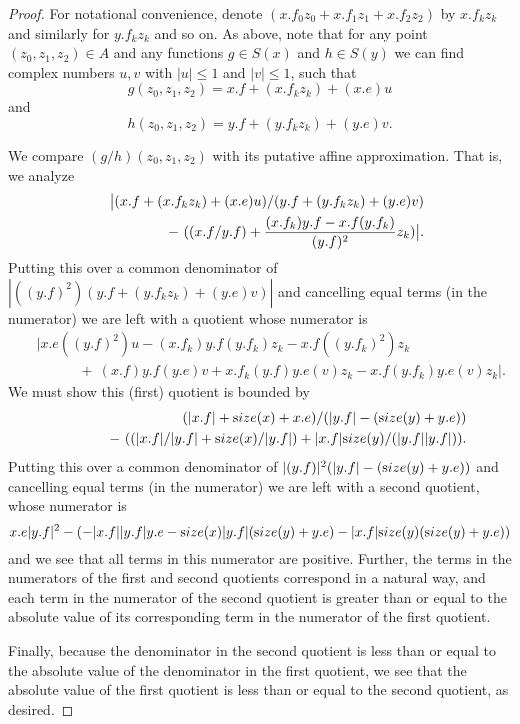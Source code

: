 \begin{proof}{} 
For notational convenience, denote $(x.f_0 z_0 + x.f_1 z_1 + x.f_2 z_2)$ by $x.f_k z_k$ and similarly for $y.f_k z_k$ and so on.
As above, note that for any point $(z_0, z_1, z_2) \in A$ and any functions $g \in S(x)$ and $h \in S(y)$ we can find complex numbers $u, v$ with $|u| \le 1$ and $|v| \le 1$, such that
$$ g(z_0, z_1, z_2) = x.f + (x.f_k z_k) + (x.e) u$$ and 
$$ h(z_0, z_1, z_2) = y.f + (y.f_k z_k) + (y.e) v.$$ 

We compare $(g/h)(z_0, z_1, z_2)$ with its putative affine approximation.  That is, we analyze
\begin{eqnarray*}
&&\big|(x.f + (x.f_k z_k) + (x.e) u)/(y.f + (y.f_k z_k) + (y.e) v)\\
&&\qquad\quad - \
((x.f / y.f) + {(x.f_k) y.f - x.f (y.f_k) \over (y.f)^2} z_k)\big|
          . \end{eqnarray*}
Putting this over a common denominator  of 
$|((y.f)^2)(y.f + (y.f_k z_k) + (y.e) v)|$
and cancelling equal terms (in the numerator) we are left with a quotient whose numerator is 
\begin{eqnarray*} &&
|x.e ((y.f)^2) u - (x.f_k) y.f (y.f_k) z_k - x.f ((y.f_k)^2) z_k\\
&&\qquad\quad  + \
(x.f) y.f (y.e) v + x.f_k (y.f) y.e (v) z_k - x.f (y.f_k) y.e (v) z_k|.              
\end{eqnarray*}
We must show this (first) quotient is bounded by
\begin{eqnarray*}
&&
(|x.f| + {\textrm size}(x) + x.e) /(|y.f| - ({\textrm size}(y) + y.e)) \\
&&\qquad\quad - \
((|x.f|/|y.f| + {\textrm size}(x)/|y.f|) + |x.f| {\textrm size}(y)/(|y.f||y.f|)).        
\end{eqnarray*}
Putting this over a common denominator of 
$|(y.f)|^2 (|y.f| - ({\textrm size}(y) + y.e))$ 
and cancelling equal terms (in the numerator) we are left with a second quotient, whose numerator is 
$$x.e |y.f|^2 - (-|x.f| |y.f| y.e - {\textrm size}(x) |y.f| ({\textrm size}(y) + y.e) -
|x.f| {\textrm size}(y) ({\textrm size}(y) + y.e))$$
and we see that all terms in this numerator are positive.
Further, the terms in the numerators of the first and second quotients correspond in a natural way, and each term in the numerator of the second quotient  is greater than or equal to the absolute value of its corresponding term in the numerator of the first quotient.  

Finally,
 because the denominator in the second quotient is less than or equal to the absolute value of the denominator in the first quotient, we
see that the absolute value of the first quotient is less than or equal to the second quotient, as desired. \end{proof}

